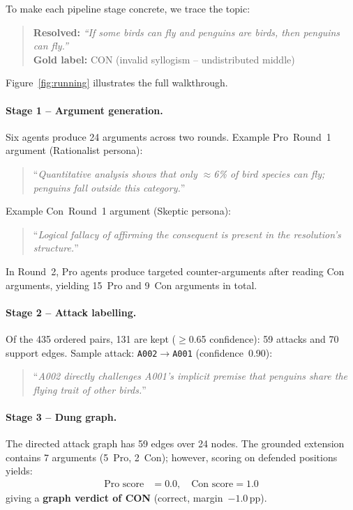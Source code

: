 \documentclass[11pt,twocolumn,letterpaper]{article}
\begin{document}
To make each pipeline stage concrete, we trace the topic:

\begin{quote}
\textbf{Resolved:} \textit{``If some birds can fly and penguins are birds,
then penguins can fly.''}\\
\textbf{Gold label:} CON \quad (invalid syllogism -- undistributed middle)
\end{quote}

Figure~\ref{fig:running} illustrates the full walkthrough.

\paragraph{Stage 1 -- Argument generation.}
Six agents produce 24 arguments across two rounds.
Example Pro~Round~1 argument (Rationalist persona):
\begin{quote}
\small``\textit{Quantitative analysis shows that only $\approx$6\% of bird
species can fly; penguins fall outside this category.}''
\end{quote}
Example Con~Round~1 argument (Skeptic persona):
\begin{quote}
\small``\textit{Logical fallacy of affirming the consequent is present in the
resolution's structure.}''
\end{quote}
In Round~2, Pro agents produce targeted counter-arguments after reading Con
arguments, yielding 15~Pro and 9~Con arguments in total.

\paragraph{Stage 2 -- Attack labelling.}
Of the 435 ordered pairs, 131 are kept ($\ge$0.65 confidence): 59 attacks
and 70 support edges.
Sample attack: \texttt{A002}$\to$\texttt{A001} (confidence~0.90):
\begin{quote}
\small``\textit{A002 directly challenges A001's implicit premise that
penguins share the flying trait of other birds.}''
\end{quote}

\paragraph{Stage 3 -- Dung graph.}
The directed attack graph has 59 edges over 24 nodes.
The grounded extension contains 7 arguments (5~Pro, 2~Con);
however, scoring on defended positions yields:
\begin{align*}
\text{Pro score}&=0.0,\quad \text{Con score}=1.0
\end{align*}
giving a \textbf{graph verdict of CON} (correct, margin~$-1.0$\,pp).
\end{document}
